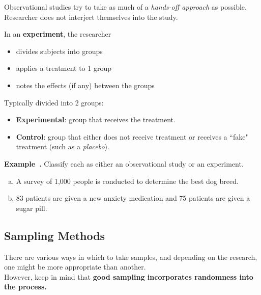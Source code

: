 \documentclass{article}
\newcounter{example}[section]
\newenvironment{example}[1][]{\refstepcounter{example}\par\medskip
   {\color{red}\textbf{Example~\theexample. #1}}}{\medskip}
\begin{document}
Observational studies try to take as much of a \textit{hands-off approach} as possible. \newline\\	
Researcher does not interject themselves into the study. 


\begin{tcolorbox}[colframe=green!60!black,title=\textbf{Experiment}]
In an \textbf{experiment}, the researcher 
\begin{itemize}
    \item divides subjects into groups
    \item applies a treatment to 1 group
    \item notes the effects (if any) between the groups
\end{itemize}
\end{tcolorbox}
\vspace{8pt}	
Typically divided into 2 groups:
\begin{itemize}
	\item \textbf{Experimental}: group that receives the treatment.	
	\item \textbf{Control}: group that either does not receive treatment or receives a ``fake" treatment (such as a \textit{placebo}).
\end{itemize}

\begin{example}
Classify each as either an observational study or an experiment.
\begin{enumerate}[(a)]
    \item A survey of 1,000 people is conducted to determine the best dog breed.
    \item 83 patients are given a new anxiety medication and 75 patients are given a sugar pill.
\end{enumerate}
\end{example}

\subsection*{Sampling Methods}

There are various ways in which to take samples, and depending on the research, one might be more appropriate than another.	\newline\\	

However, keep in mind that {\color{blue}\textbf{good sampling incorporates randomness into the process.}}
\end{document}
